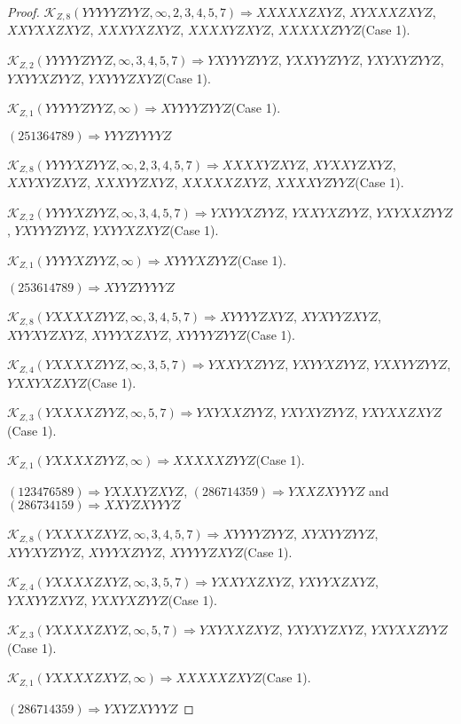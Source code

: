 \documentclass[12pt]{article}
\theoremstyle{plain}
\theoremstyle{definition}
\theoremstyle{remark}
\newcommand{\fancy}[1]{\mathcal{#1}}
\def\K{\fancy{K}}
\begin{document}
\begin{proof}
	
	$\K_{Z,8}(YYYYYZYYZ,\infty,2, 3, 4, 5, 7)\Rightarrow $$XXXXXZXYZ$, $XYXXXZXYZ$, $XXYXXZXYZ$, $XXXYXZXYZ$, $XXXXYZXYZ$, $XXXXXZYYZ$(Case 1).
	
	$\K_{Z,2}(YYYYYZYYZ,\infty,3, 4, 5, 7)\Rightarrow $$YXYYYZYYZ$, $YXXYYZYYZ$, $YXYXYZYYZ$, $YXYYXZYYZ$, $YXYYYZXYZ$(Case 1).
	
	$\K_{Z,1}(YYYYYZYYZ,\infty)\Rightarrow $$XYYYYZYYZ$(Case 1).
	
	
	
	$(2 5 1 3 6 4 7 8 9)\Rightarrow YYYZYYYYZ$
	
	
	$\K_{Z,8}(YYYYXZYYZ,\infty,2, 3, 4, 5, 7)\Rightarrow $$XXXXYZXYZ$, $XYXXYZXYZ$, $XXYXYZXYZ$, $XXXYYZXYZ$, $XXXXXZXYZ$, $XXXXYZYYZ$(Case 1).
	
	$\K_{Z,2}(YYYYXZYYZ,\infty,3, 4, 5, 7)\Rightarrow $$YXYYXZYYZ$, $YXXYXZYYZ$, $YXYXXZYYZ$, $YXYYYZYYZ$, $YXYYXZXYZ$(Case 1).
	
	$\K_{Z,1}(YYYYXZYYZ,\infty)\Rightarrow $$XYYYXZYYZ$(Case 1).
	
	
	
	$(2 5 3 6 1 4 7 8 9)\Rightarrow XYYZYYYYZ$
	
	
	$\K_{Z,8}(YXXXXZYYZ,\infty,3, 4, 5, 7)\Rightarrow $$XYYYYZXYZ$, $XYXYYZXYZ$, $XYYXYZXYZ$, $XYYYXZXYZ$, $XYYYYZYYZ$(Case 1).
	
	$\K_{Z,4}(YXXXXZYYZ,\infty,3, 5, 7)\Rightarrow $$YXXYXZYYZ$, $YXYYXZYYZ$, $YXXYYZYYZ$, $YXXYXZXYZ$(Case 1).
	
	$\K_{Z,3}(YXXXXZYYZ,\infty,5, 7)\Rightarrow $$YXYXXZYYZ$, $YXYXYZYYZ$, $YXYXXZXYZ$(Case 1).
	
	$\K_{Z,1}(YXXXXZYYZ,\infty)\Rightarrow $$XXXXXZYYZ$(Case 1).
	
	
	
	$(1 2 3 4 7 6 5 8 9)\Rightarrow YXXXYZXYZ$, $(2 8 6 7 1 4 3 5 9)\Rightarrow YXXZXYYYZ$ and $(2 8 6 7 3 4 1 5 9)\Rightarrow XXYZXYYYZ$
	
	
	$\K_{Z,8}(YXXXXZXYZ,\infty,3, 4, 5, 7)\Rightarrow $$XYYYYZYYZ$, $XYXYYZYYZ$, $XYYXYZYYZ$, $XYYYXZYYZ$, $XYYYYZXYZ$(Case 1).
	
	$\K_{Z,4}(YXXXXZXYZ,\infty,3, 5, 7)\Rightarrow $$YXXYXZXYZ$, $YXYYXZXYZ$, $YXXYYZXYZ$, $YXXYXZYYZ$(Case 1).
	
	$\K_{Z,3}(YXXXXZXYZ,\infty,5, 7)\Rightarrow $$YXYXXZXYZ$, $YXYXYZXYZ$, $YXYXXZYYZ$(Case 1).
	
	$\K_{Z,1}(YXXXXZXYZ,\infty)\Rightarrow $$XXXXXZXYZ$(Case 1).
	
	
	
	$(2 8 6 7 1 4 3 5 9)\Rightarrow YXYZXYYYZ$
	

\end{proof}
\end{document}

